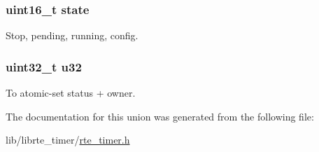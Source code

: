 \subsubsection[{state}]{\setlength{\rightskip}{0pt plus 5cm}uint16\+\_\+t state}\label{unionrte__timer__status_af4ea525e6f15623e4e9c6c6aa75f2077}
Stop, pending, running, config. \hypertarget{unionrte__timer__status_ae65af0c4a8ee050043fe4b575f0a26a0}{}
\subsubsection[{u32}]{\setlength{\rightskip}{0pt plus 5cm}uint32\+\_\+t u32}\label{unionrte__timer__status_ae65af0c4a8ee050043fe4b575f0a26a0}
To atomic-\/set status + owner. 

The documentation for this union was generated from the following file\+:\begin{DoxyCompactItemize}
\item 
lib/librte\+\_\+timer/\hyperlink{rte__timer_8h}{rte\+\_\+timer.\+h}\end{DoxyCompactItemize}
